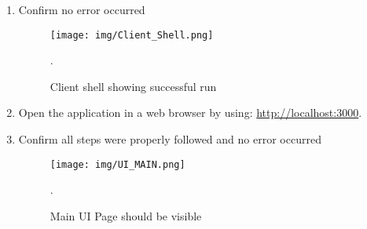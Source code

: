 \begin{enumerate}
     \item Confirm no error occurred
     \begin{figure}[!h]
        \centering
        \texttt{[image: img/Client\_Shell.png]}
        \caption{Client shell showing successful run}.
        \label{fig:Client_Shell}
    \end{figure}
    \item Open the application in a web browser by using:
    \url{http://localhost:3000}.
    \item Confirm all steps were properly followed and no error occurred
     \begin{figure}[!h]
        \centering
        \texttt{[image: img/UI\_MAIN.png]}
        \caption{Main UI Page should be visible}.
        \label{fig:UI_MAIN}
\end{figure}

\end{enumerate}